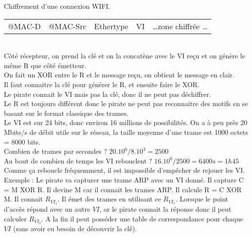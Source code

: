  Chiffrement d'une connexion WIFI. \\
\begin{tabular}{l|l|l|l|l}
	@MAC-D & @MAC-Src & Ethertype & VI & \ldots zone chiffrée \ldots \\
\end{tabular} \\
Côté récepteur, on prend la clé et on la concatène avec le VI reçu et on génère le même R que côté émetteur. \\
On fait un XOR entre le R et le message reçu, on obtient le message en clair. \\
Il faut connaitre la clé pour générer le R, et ensuite faire le XOR. \\
Le pirate connait le VI mais pas la clé, donc il ne peut pas déchiffrer. \\
Le R est toujours différent donc le pirate ne peut pas reconnaitre des motifs en se basant sur le format classique des trames. \\

 Le VI est sur 24 bits, donc environ 16 millions de possibilités. On a à peu près 20 Mbits/s de débit utile sur le réseau, la taille moyenne d'une trame est 1000 octets = 8000 bits. \\
Combien de trames par secondes ? $20.10^6 / 8.10^3 = 2 500$ \\
Au bout de combien de temps les VI rebouclent ? $16.10^6 / 2 500 = 6400s = 1h45$\\
Comme ça reboucle fréquemment, il est impossible d'empêcher de rejouer les VI. \\
Exemple : Le pirate va capturer une trame ARP avec un VI donné. Il capture C = M XOR R. Il devine M car il connait les trames ARP. Il calcule R = C XOR M. Il connait $R_{VI_1}$. Il émet des trames en utilisant ce $R_{VI_1}$. Lorsque le point d'accès répond avec un autre $VI$, or le pirate connait la réponse donc il peut calculer $R_{VI_2}$. A la fin il peut posséder une table de correspondance pour chaque $VI$ (sans avoir eu besoin de découvrir la clé).

